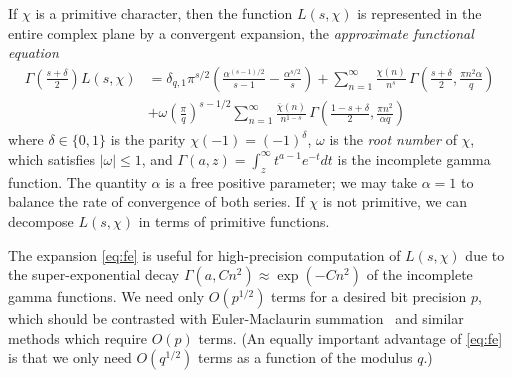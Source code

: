 \documentclass[reqno]{amsart}
\newcommand{\ov}[1]{\overline{#1}}
\newcommand{\om}{\omega}
\theoremstyle{definition}
\begin{document}
If $\chi$ is a primitive character,
then the function $L(s,\chi)$ is represented in the entire complex plane
by a convergent expansion,
the \emph{approximate functional equation} \cite[Theorem~7.3]{Cohen2019}
\begin{equation}
\begin{aligned}
\Gamma\!\left(\frac{s+\delta}{2}\right) \!L(s,\chi) &= %
\delta_{q,1}\pi^{s/2}\!\left(\frac{\alpha^{(s-1)/2}}{s-1}-\frac{\alpha^{s/2}}{s}\right)
+ \sum_{n=1}^{\infty} \frac{\chi(n)}{n^s} \, \Gamma\!\left(\frac{s+\delta}{2}, \frac{\pi n^2 \alpha}{q}\right) \\
& + \omega \left(\frac{\pi}{q}\right)^{\!\!s-1/2} \sum_{n=1}^{\infty} \frac{\overline{\chi}(n)}{n^{1-s}} \, \Gamma\!\left(\frac{1-s+\delta}{2}, \frac{\pi n^2}{ \alpha q}\right)
\end{aligned}
\label{eq:fe}
\end{equation}
where $\delta \in \{0, 1\}$ is the parity $\chi(-1) = (-1)^\delta$,
$\omega$ is the \emph{root number} of $\chi$,
which satisfies $|\omega| \le 1$,
and $\Gamma(a,z) = \int_z^{\infty} t^{a-1} e^{-t} dt$ is
the incomplete gamma function.
The quantity $\alpha$ is a free positive parameter;
we may take $\alpha = 1$ to balance the rate of convergence
of both series.
If $\chi$ is not primitive, we can decompose $L(s,\chi)$
in terms of primitive functions.


The expansion \eqref{eq:fe} is useful for high-precision
computation of $L(s,\chi)$ due to the super-exponential
decay $\Gamma(a, C n^2) \approx \exp(-C n^2)$ of the incomplete gamma
functions. We need only $O(p^{1/2})$ terms
for a desired bit precision $p$,
which should be contrasted with
Euler-Maclaurin summation~\cite[\S 4.2]{belabas2021numerical} \cite{Johansson2014hurwitz}
and similar methods which require $O(p)$ terms.
(An equally important advantage of \eqref{eq:fe}
is that we only need $O(q^{1/2})$
terms as a function of the modulus $q$.)
\end{document}
